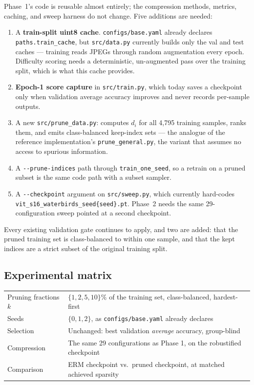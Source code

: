 \documentclass[11pt]{article}
\begin{document}
Phase~1's code is reusable almost entirely; the compression methods, metrics,
caching, and sweep harness do not change. Five additions are needed:

\begin{enumerate}
\item A \textbf{train-split uint8 cache}. \texttt{configs/base.yaml} already
declares \texttt{paths.train\_cache}, but \texttt{src/data.py} currently builds
only the val and test caches --- training reads JPEGs through random augmentation
every epoch. Difficulty scoring needs a deterministic, un-augmented pass over the
training split, which is what this cache provides.
\item \textbf{Epoch-1 score capture} in \texttt{src/train.py}, which today saves a
checkpoint only when validation average accuracy improves and never records
per-sample outputs.
\item A new \texttt{src/prune\_data.py}: computes $d_i$ for all 4{,}795 training
samples, ranks them, and emits class-balanced keep-index sets --- the analogue of
the reference implementation's \texttt{prune\_general.py}, the variant that
assumes no access to spurious information.
\item A \texttt{-{}-prune-indices} path through \texttt{train\_one\_seed}, so a
retrain on a pruned subset is the same code path with a subset sampler.
\item A \texttt{-{}-checkpoint} argument on \texttt{src/sweep.py}, which currently
hard-codes \texttt{vit\_s16\_\allowbreak waterbirds\_\allowbreak seed\{seed\}.pt}. Phase~2 needs the same
29-configuration sweep pointed at a second checkpoint.
\end{enumerate}

Every existing validation gate continues to apply, and two are added: that the
pruned training set is class-balanced to within one sample, and that the kept
indices are a strict subset of the original training split.

\subsection{Experimental matrix}

\begin{table}[h]
\centering
\small
\begin{tabular}{@{}ll@{}}
\toprule
Pruning fractions $k$ & $\{1, 2, 5, 10\}\%$ of the training set, class-balanced, hardest-first \\
Seeds & $\{0, 1, 2\}$, as \texttt{configs/base.yaml} already declares \\
Selection & Unchanged: best validation \emph{average} accuracy, group-blind \\
Compression & The same 29 configurations as Phase 1, on the robustified checkpoint \\
Comparison & ERM checkpoint vs.\ pruned checkpoint, at matched achieved sparsity \\
\bottomrule
\end{tabular}
\end{table}
\end{document}
